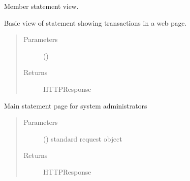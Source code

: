 \documentclass[letterpaper,10pt,english]{sphinxmanual}
\begin{document}

\begin{fulllineitems}
\label{\detokenize{payments:payments.views.statement}}
Member statement view.

Basic view of statement showing transactions in a web page.
\begin{quote}\begin{description}
\item[{Parameters}] \leavevmode
{} () \textendash{} 

\item[{Returns}] \leavevmode
HTTPResponse

\end{description}\end{quote}

\end{fulllineitems}


\begin{fulllineitems}
\label{\detokenize{payments:payments.views.statement_admin_summary}}
Main statement page for system administrators
\begin{quote}\begin{description}
\item[{Parameters}] \leavevmode
{} () \textendash{} standard request object

\item[{Returns}] \leavevmode
HTTPResponse

\end{description}\end{quote}

\end{fulllineitems}

\end{document}
